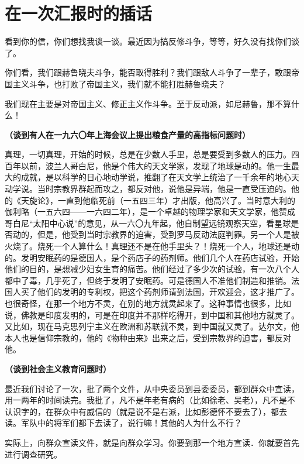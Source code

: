 \section[在一次汇报时的插话（一九六四年三月）]{在一次汇报时的插话}

看到你的信，你们想找我谈一谈。最近因为搞反修斗争，等等，好久没有找你们谈了。

你们看，我们跟赫鲁晓夫斗争，能否取得胜利？我们跟敌人斗争了一辈子，敢跟帝国主义斗争，也打败了帝国主义，我们就不能打胜赫鲁晓夫？

我们现在主要是对帝国主义、修正主义作斗争。至于反动派，如尼赫鲁，那不算什么！

\textbf{（谈到有人在一九六〇年上海会议上提出粮食产量的高指标问题时）}

真理，一切真理，开始的时候，总是在少数人手里，总是要受到多数人的压力。四百年以前，波兰人哥白尼，他是个伟大的天文学家，发现了地球是动的。他一生最大的成就，是以科学的日心地动学说，推翻了在天文学上统治了一千余年的地心天动学说。当时宗教界群起而攻之，都反对他，说他是异端，他是一直受压迫的。他的《天旋论》，一直到他临死前（一五四三年）才出版，他高兴了。当时意大利的伽利略（一五六四——一六四二年），是一个卓越的物理学家和天文学家，他赞成哥白尼“太阳中心说”的意见，从一六〇九年起，他自制望远镜观察天空，看星球是否动的，但是，他受到当时宗教界的迫害，受到罗马反动法庭判罪。另一个人是被火烧了。烧死一个人算什么！真理还不是在他手里头？！烧死一个人，地球还是动的。发明安眠药的是德国人，是个药店子的药剂师。他们几个人在药店试验，开始他们的目的，是想减少妇女生育的痛苦。他们经过了多少次的试验，有一次八个人都中了毒，几乎死了，但终于发明了安眠药。可是德国人不准他们制造和推销。法国人买了他们的发明的专利权，把这个药剂师请到法国，开欢迎会，这才推广了。也很奇怪，在那一个地方不灵，在别的地方就灵起来了。这种事情也很多，比如说，佛教是印度发明的，可是在印度并不那样吃得开，到中国和其他地方就灵了。又比如，现在马克思列宁主义在欧洲和苏联就不灵，到中国就又灵了。达尔文，他本人也是信仰宗教的，他的《物种由来》出来之后，受到宗教界的迫害，都反对他。

\textbf{（谈到社会主义教育问题时）}

最近我们讨论了一次，批了两个文件，从中央委员到县委委员，都到群众中宣读，用一两年的时间读完。我批了，凡不是年老有病的（比如徐老、吴老），凡不是不认识字的，在群众中有威信的（就是说不是右派，比如彭德怀不要去了），都去读。军队中的将军们都下去读了，说行嘛！其他的人为什么不行？

实际上，向群众宣读文件，就是向群众学习。你要到那一个地方宣读．你就要首先进行调查研究。

